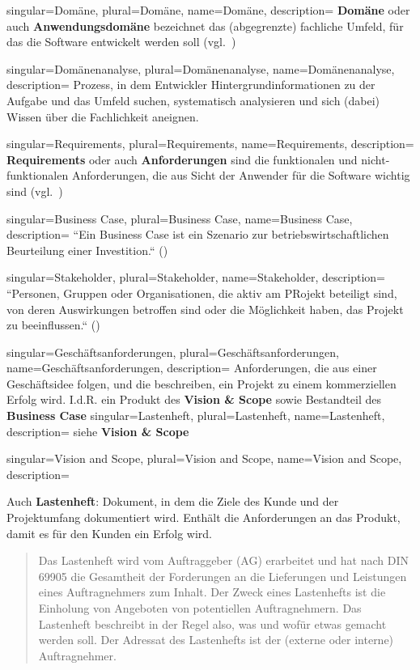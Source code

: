 {
singular={Domäne},
plural={Domäne},
name={Domäne},
description={
\textbf{Domäne} oder auch \textbf{Anwendungsdomäne} bezeichnet das (abgegrenzte) fachliche Umfeld, für das die Software entwickelt werden soll (vgl.~\cite[41]{Wed09})
}
}

{
singular={Domänenanalyse},
plural={Domänenanalyse},
name={Domänenanalyse},
description={
Prozess, in dem Entwickler Hintergrundinformationen zu der Aufgabe und das Umfeld suchen, systematisch analysieren und sich (dabei) Wissen über die Fachlichkeit aneignen.
}
}


{
singular={Requirements},
plural={Requirements},
name={Requirements},
description={
\textbf{Requirements} oder auch \textbf{Anforderungen} sind die funktionalen und nicht-funktionalen Anforderungen, die aus Sicht der Anwender für die Software wichtig sind  (vgl.~\cite[41]{Wed09})
}
}

{
singular={Business Case},
plural={Business Case},
name={Business Case},
description={
``Ein Business Case ist ein Szenario zur betriebswirtschaftlichen Beurteilung einer Investition.`` (\cite[11]{Brug09})
}
}

{
singular={Stakeholder},
plural={Stakeholder},
name={Stakeholder},
description={
``Personen, Gruppen oder Organisationen, die aktiv am PRojekt beteiligt sind, von deren Auswirkungen betroffen sind oder die Möglichkeit haben, das Projekt zu beeinflussen.`` (\cite[49]{Wed09})
}
}


{
singular={Geschäftsanforderungen},
plural={Geschäftsanforderungen},
name={Geschäftsanforderungen},
description={
Anforderungen, die aus einer Geschäftsidee folgen, und die beschreiben, ein Projekt zu einem kommerziellen Erfolg wird. I.d.R. ein Produkt des \textbf{Vision \& Scope} sowie Bestandteil des \textbf{Business Case}
}
}
{
singular={Lastenheft},
plural={Lastenheft},
name={Lastenheft},
description={
siehe \textbf{Vision \& Scope}
}
}


{
singular={Vision and Scope},
plural={Vision and Scope},
name={Vision and Scope},
description={
Auch \textbf{Lastenheft}: Dokument, in dem die Ziele des Kunde und der Projektumfang dokumentiert wird. Enthält die Anforderungen an das Produkt, damit es für den Kunden ein Erfolg wird.\\
\blockquote[{\cite[305]{AABG14m}}]{
Das Lastenheft wird vom Auftraggeber (AG) erarbeitet und hat
nach DIN 69905 die Gesamtheit der Forderungen an die Lieferungen und Leistungen eines Auftragnehmers zum Inhalt. Der Zweck eines Lastenhefts ist die Einholung von Angeboten von potentiellen Auftragnehmern. Das Lastenheft beschreibt
in der Regel also, was und wofür etwas gemacht werden soll. Der Adressat des
Lastenhefts ist der (externe oder interne) Auftragnehmer.
}


}
}


